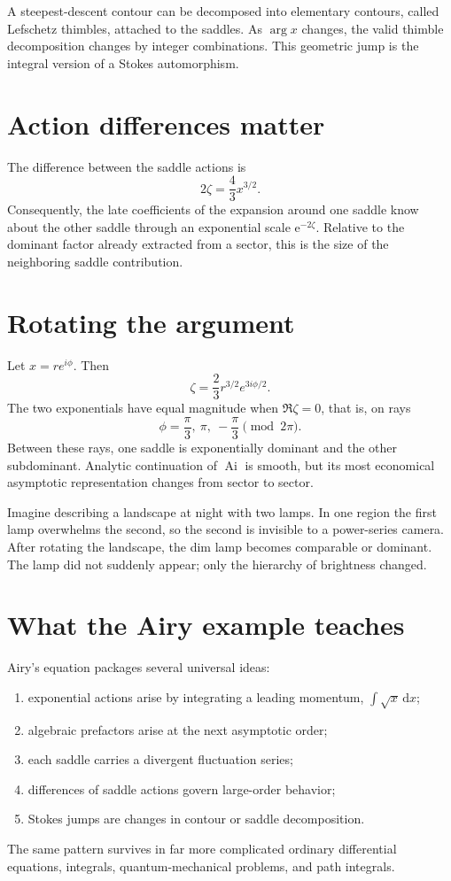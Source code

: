 \documentclass[11pt,oneside]{book}
\theoremstyle{definition}
\theoremstyle{remark}
\newcommand{\Ai}{\operatorname{Ai}}
\newcommand{\e}{\mathrm{e}}
\newcommand{\dd}{\,\mathrm{d}}
\begin{document}
A steepest-descent contour can be decomposed into elementary contours, called
Lefschetz thimbles, attached to the saddles. As $\arg x$ changes, the valid
thimble decomposition changes by integer combinations. This geometric jump is
the integral version of a Stokes automorphism.

\section{Action differences matter}

The difference between the saddle actions is
\begin{equation}
  2\zeta=\frac43x^{3/2}.
  \label{eq:airy-action-difference}
\end{equation}
Consequently, the late coefficients of the expansion around one saddle know
about the other saddle through an exponential scale
$\e^{-2\zeta}$. Relative to the dominant factor already extracted from a sector,
this is the size of the neighboring saddle contribution.

\section{Rotating the argument}

Let $x=re^{i\phi}$. Then
\[
  \zeta=\frac23r^{3/2}e^{3i\phi/2}.
\]
The two exponentials have equal magnitude when $\Re\zeta=0$, that is, on rays
\[
  \phi=\frac{\pi}{3},\ \pi,\ -\frac{\pi}{3}
  \pmod{2\pi}.
\]
Between these rays, one saddle is exponentially dominant and the other
subdominant. Analytic continuation of $\Ai$ is smooth, but its most economical
asymptotic representation changes from sector to sector.

\begin{intuitionbox}
Imagine describing a landscape at night with two lamps. In one region the first
lamp overwhelms the second, so the second is invisible to a power-series camera.
After rotating the landscape, the dim lamp becomes comparable or dominant. The
lamp did not suddenly appear; only the hierarchy of brightness changed.
\end{intuitionbox}

\section{What the Airy example teaches}

Airy's equation packages several universal ideas:
\begin{enumerate}
\item exponential actions arise by integrating a leading momentum,
$\int\sqrt{x}\dd x$;
\item algebraic prefactors arise at the next asymptotic order;
\item each saddle carries a divergent fluctuation series;
\item differences of saddle actions govern large-order behavior;
\item Stokes jumps are changes in contour or saddle decomposition.
\end{enumerate}
The same pattern survives in far more complicated ordinary differential
equations, integrals, quantum-mechanical problems, and path integrals.
\end{document}
